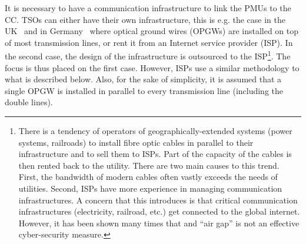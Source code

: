 It is necessary to have a communication infrastructure to link the PMUs to the CC. TSOs can either have their own infrastructure, this is e.g. the case in the UK~\cite[p110]{bookUK_OPGW} and in Germany~\cite[p42]{ThesisInspire} where optical ground wires (OPGWs) are installed on top of most transmission lines, or rent it from an Internet service provider (ISP). In the second case, the design of the infrastructure is outsourced to the ISP\footnote{There is a tendency of operators of geographically-extended systems (power systems, railroads) to install fibre optic cables in parallel to their infrastructure and to sell them to ISPs. Part of the capacity of the cables is then rented back to the utility. There are two main causes to this trend. First, the bandwidth of modern cables often vastly exceeds the needs of utilities. Second, ISPs have more experience in managing communication infrastructures. A concern that this introduces is that critical communication infrastructures (electricity, railroad, etc.) get connected to the global internet. However, it has been shown many times that and ``air gap'' is not an effective cyber-security measure.}. The focus is thus placed on the first case. However, ISPs use a similar methodology to what is described below. Also, for the sake of simplicity, it is assumed that a single OPGW is installed in parallel to every transmission line (including the double lines).

